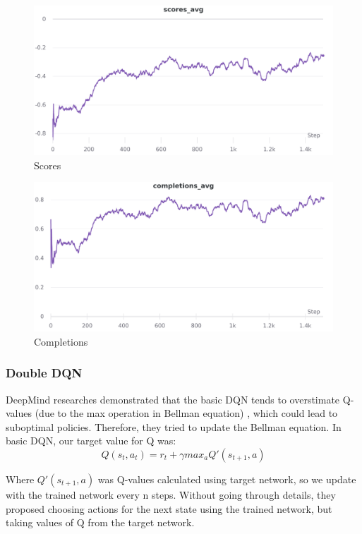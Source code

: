 \documentclass[12pt]{article}
\begin{document}
\begin{figure}[H]
        \centerline{\includegraphics[scale=.2]{res/charts/vanilla_scores.png}}
        \caption{Scores}
\end{figure}

\begin{figure}[H]
        \centerline{\includegraphics[scale=.2]{res/charts/vanilla_completions.png}}
        \caption{Completions}
\end{figure}

\subsubsection{Double DQN}
DeepMind researches demonstrated that the basic DQN tends to overstimate Q-values (due to the max operation in Bellman equation) \cite{double-dqn}, which could lead to suboptimal policies. Therefore, they tried to update the Bellman equation.
In basic DQN, our target value for Q was:
\[ Q(s_t,a_t)= r_t+\gamma max_a Q'(s_{t+1},a)\]

Where $Q'(s_{t+1},a)$ was Q-values calculated using target network, so we update with the trained network every n steps.
Without going through details, they proposed choosing actions for the next state using the trained network, but taking values of Q from the target network.
\end{document}
